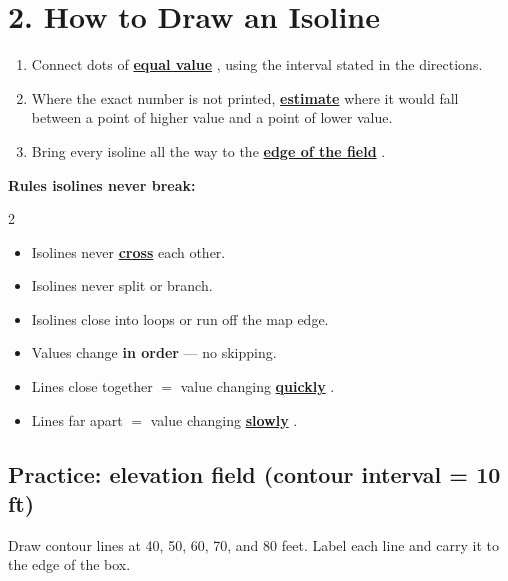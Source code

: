\documentclass[11pt,addpoints]{exam}
\newcommand{\blk}[2][3.2cm]{%
  \ifprintanswers
    \underline{\textcolor{keyblue}{\textbf{#2}}}%
  \else
    \underline{\hspace{#1}}%
  \fi}
\begin{document}
\section*{2. How to Draw an Isoline}

\begin{enumerate}[leftmargin=*,itemsep=6pt]
  \item Connect dots of \blk[3cm]{equal value}, using the interval stated in the directions.
  \item Where the exact number is not printed, \blk[2.5cm]{estimate} where it would fall between a point of higher value and a point of lower value.
  \item Bring every isoline all the way to the \blk[3cm]{edge of the field}.
\end{enumerate}

\textbf{Rules isolines never break:}

\begin{multicols}{2}
\begin{itemize}[leftmargin=*,itemsep=4pt]
  \item Isolines never \blk[2cm]{cross} each other.
  \item Isolines never split or branch.
  \item Isolines close into loops or run off the map edge.
  \item Values change \textbf{in order} --- no skipping.
  \item Lines close together $=$ value changing \blk[2cm]{quickly}.
  \item Lines far apart $=$ value changing \blk[2cm]{slowly}.
\end{itemize}
\end{multicols}

\subsection*{Practice: elevation field (contour interval = 10 ft)}

Draw contour lines at 40, 50, 60, 70, and 80 feet. Label each line and carry it to the edge of the box.

\begin{center}
\end{center}
\end{document}
